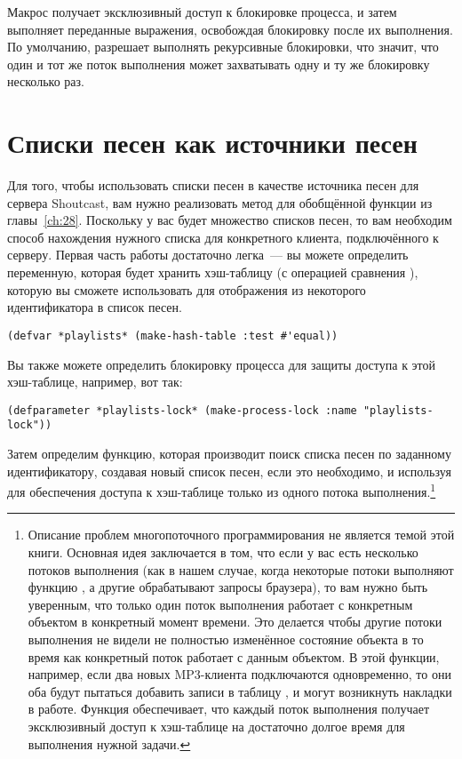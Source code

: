 Макрос  получает эксклюзивный доступ к блокировке процесса, и
затем выполняет переданные выражения, освобождая блокировку после их выполнения.  По
умолчанию,  разрешает выполнять рекурсивные блокировки, что
значит, что один и тот же поток выполнения может захватывать одну и ту же блокировку
несколько раз.

\section{Списки песен как источники песен}

Для того, чтобы использовать списки песен в качестве источника песен для сервера
Shoutcast, вам нужно реализовать метод для обобщённой функции  из
главы~\ref{ch:28}.  Поскольку у вас будет множество списков песен, то вам необходим способ
нахождения нужного списка для конкретного клиента, подключённого к серверу.  Первая часть
работы достаточно легка~--- вы можете определить переменную, которая будет хранить
хэш-таблицу (с операцией сравнения ), которую вы сможете использовать для
отображения из некоторого идентификатора в список песен.

\begin{lstlisting}
(defvar *playlists* (make-hash-table :test #'equal))
\end{lstlisting}

Вы также можете определить блокировку процесса для защиты доступа к этой хэш-таблице,
например, вот так:

\begin{lstlisting}
(defparameter *playlists-lock* (make-process-lock :name "playlists-lock"))
\end{lstlisting}

Затем определим функцию, которая производит поиск списка песен по заданному
идентификатору, создавая новый список песен, если это необходимо, и используя
 для обеспечения доступа к хэш-таблице только из одного потока
выполнения.\footnote{Описание проблем многопоточного программирования не является темой
  этой книги. Основная идея заключается в том, что если у вас есть несколько потоков
  выполнения (как в нашем случае, когда некоторые потоки выполняют функцию
  , а другие обрабатывают запросы браузера), то вам нужно быть уверенным,
  что только один поток выполнения работает с конкретным объектом в конкретный момент
  времени.  Это делается чтобы другие потоки выполнения не видели не полностью изменённое
  состояние объекта в то время как конкретный поток работает с данным объектом.  В этой
  функции, например, если два новых MP3-клиента подключаются одновременно, то они оба
  будут пытаться добавить записи в таблицу , и могут возникнуть накладки
  в работе.  Функция  обеспечивает, что каждый поток выполнения
  получает эксклюзивный доступ к хэш-таблице на достаточно долгое время для выполнения
  нужной задачи.}

